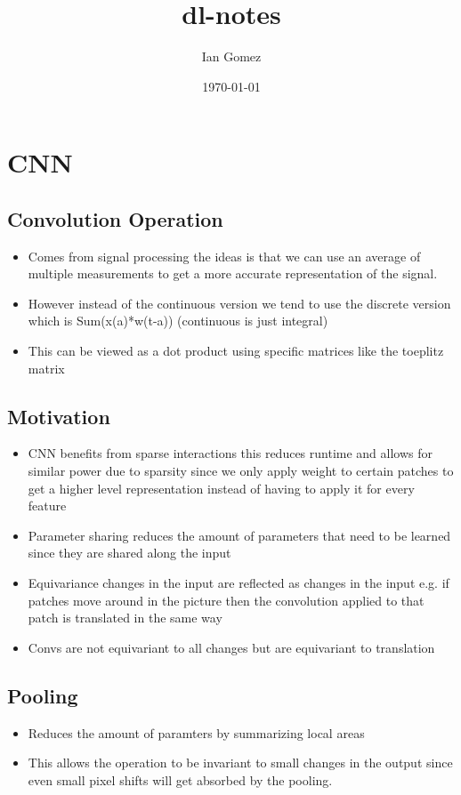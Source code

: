 \documentclass[11pt]{article}
\author{Ian Gomez}
\date{\today}
\title{dl-notes}
\begin{document}
\maketitle
\tableofcontents

\section{CNN}
\label{sec:orgfb224ff}
\subsection{Convolution Operation}
\label{sec:orgfaf9e72}
\begin{itemize}
\item Comes from signal processing the ideas is that we can use an average of multiple measurements to get a more accurate representation of the signal.
\item However instead of the continuous version we tend to use the discrete version which is Sum(x(a)*w(t-a)) (continuous is just integral)
\item This can be viewed as a dot product using specific matrices like the toeplitz matrix
\end{itemize}
\subsection{Motivation}
\label{sec:orgcf15bff}
\begin{itemize}
\item CNN benefits from sparse interactions this reduces runtime and allows for similar power due to sparsity since we only apply weight to certain patches to get a higher level representation instead of having to apply it for every feature
\item Parameter sharing reduces the amount of parameters that need to be learned since they are shared along the input
\item Equivariance changes in the input are reflected as changes in the input e.g. if patches move around in the picture then the convolution applied to that patch is translated in the same way
\item Convs are not equivariant to all changes but are equivariant to translation
\end{itemize}
\subsection{Pooling}
\label{sec:org8d95d76}
\begin{itemize}
\item Reduces the amount of paramters by summarizing local areas
\item This allows the operation to be invariant to small changes in the output since even small pixel shifts will get absorbed by the pooling.
\end{itemize}
\end{document}
